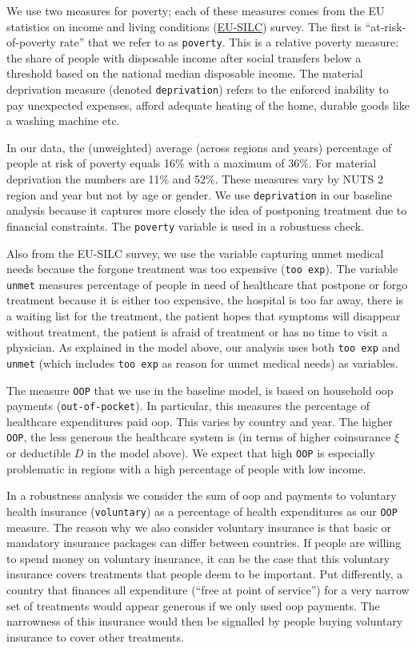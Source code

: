 \documentclass[a4paper,12pt]{article}
\begin{document}
We use two measures for poverty; each of these measures comes from the EU statistics on income and living conditions (\href{https://ec.europa.eu/eurostat/statistics-explained/index.php?title=Glossary:EU\_statistics\_on\_income\_and\_living\_conditions\_(EU-SILC)}{EU-SILC}) survey. The first is ``at-risk-of-poverty rate'' that we refer to as \texttt{poverty}. This is a relative poverty measure: the share of people with disposable income after social transfers below a threshold based on the national median disposable income. The material deprivation measure (denoted \texttt{deprivation}) refers to the enforced inability to pay unexpected expenses, afford adequate heating of the home, durable goods like a washing machine etc. 

In our data, the (unweighted) average (across regions and years) percentage of people at risk of poverty equals 16\% with a maximum of 36\%. For material deprivation the numbers are 11\% and 52\%. These measures vary by NUTS 2 region and year but not by age or gender. We use \texttt{deprivation} in our baseline analysis because it captures more closely the idea of postponing treatment due to financial constraints. The \texttt{poverty} variable is used in a robustness check.

Also from the EU-SILC survey, we use the variable capturing unmet medical needs because the forgone treatment was too expensive (\texttt{too exp}). The variable \texttt{unmet} measures percentage of people in need of healthcare that postpone or forgo treatment because it is either too expensive, the hospital is too far away, there is a waiting list for the treatment, the patient hopes that symptoms will disappear without treatment, the patient is afraid of treatment or has no time to visit a physician. As explained in the model above, our analysis uses both \texttt{too exp}  and \texttt{unmet} (which includes \texttt{too exp} as reason for unmet medical needs) as variables.

The measure \texttt{OOP} that we use in the baseline model, is based on household oop payments (\texttt{out-of-pocket}). In particular, this measures the percentage of healthcare expenditures paid oop. This varies by country and year. The higher \texttt{OOP}, the less generous the healthcare system is (in terms of higher coinsurance \(\xi\) or deductible \(D\) in the model above). We expect that high \texttt{OOP} is especially problematic in regions with a high percentage of people with low income.

In a robustness analysis we consider the sum of oop and payments to voluntary health insurance (\texttt{voluntary}) as a percentage of health expenditures as our \texttt{OOP} measure. The reason why we also consider voluntary insurance is that basic or mandatory insurance packages can differ between countries. If people are willing to spend money on voluntary insurance, it can be the case that this voluntary insurance covers treatments that people deem to be important. Put differently, a country that finances all expenditure (``free at point of service'') for a very narrow set of treatments would appear generous if we only used oop payments. The narrowness of this insurance would then be signalled by people buying voluntary insurance to cover other treatments. 
\end{document}
